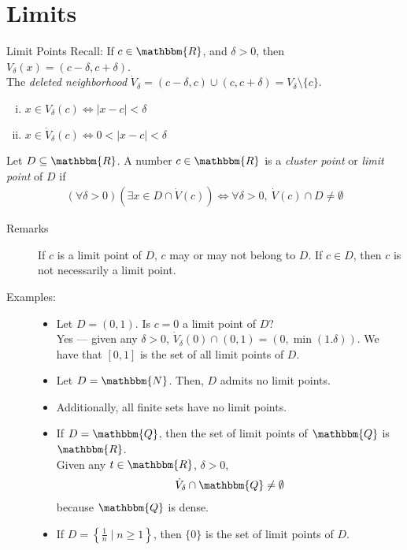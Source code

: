 \documentclass[10pt]{extarticle}
\newcommand{\N}{\mathbbm{N}}
\newcommand{\Q}{\mathbbm{Q}}
\newcommand{\R}{\mathbbm{R}}
\begin{document}
  \section*{Limits}%
  \begin{problem}{Limit Points}
    Recall: If $c\in\R$, and $\delta > 0$, then $V_{\delta}(x) = (c-\delta, c+\delta)$.\\

    The \textit{deleted neighborhood} $\dot{V}_{\delta} = (c-\delta,c) \cup (c,c+\delta) = V_{\delta}\setminus \{c\}$.
    \begin{enumerate}[(i)]
      \item $x\in V_{\delta}(c) \Leftrightarrow |x-c| < \delta$
      \item $x\in \dot{V}_{\delta}(c) \Leftrightarrow 0 < |x-c| < \delta$
    \end{enumerate}
    Let $D \subseteq \R$. A number $c\in\R$ is a \textit{cluster point} or \textit{limit point} of $D$ if 
    \begin{align*}
      (\forall \delta > 0)(\exists x\in D \cap \dot{V}(c)) \Leftrightarrow \forall \delta > 0,~\dot{V}(c)\cap D \neq \emptyset
    \end{align*}
    \begin{description}
      \item[Remarks] If $c$ is a limit point of $D$, $c$ may or may not belong to $D$. If $c\in D$, then $c$ is not necessarily a limit point.
      \item[Examples:]\hfill
        \begin{itemize}
          \item Let $D = (0,1)$. Is $c = 0$ a limit point of $D$?\\

            Yes --- given any $\delta > 0$, $\dot{V}_{\delta}(0) \cap (0,1) = (0,\min(1.\delta))$. We have that $[0,1]$ is the set of all limit points of $D$.
          \item Let $D = \N$. Then, $D$ admits no limit points.
          \item Additionally, all finite sets have no limit points.
          \item If $D = \Q$, then the set of limit points of $\Q$ is $\R$.\\

            Given any $t\in\R$, $\delta > 0$,
            \begin{align*}
              \dot{V}_{\delta} \cap \Q \neq \emptyset
            \end{align*}
            because $\Q$ is dense.
          \item If $D = \left\{\frac{1}{n}\mid n\geq 1\right\}$, then $\{0\}$ is the set of limit points of $D$.
        \end{itemize}
    \end{description}
  \end{problem}
\end{document}

